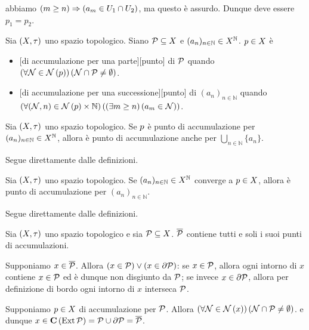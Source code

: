 abbiamo $\left ( m \geq n \right ) \Rightarrow \left ( a_m \in U_1 \cap U_2 \right )$, ma questo \`e
assurdo. Dunque deve essere $p_1 = p_2$. \EndProof
\begin{Definition}
	Sia $(X,\tau)$ uno spazio topologico.
	Siano $\mathcal{P} \subseteq X$ e $(a_n)_{n \in \mathbb{N}} \in X^\mathbb{N}$.
	$p \in X$ \`e
	\begin{itemize}
		\item {}[di accumulazione per una parte][punto] di $\mathcal{P}$ quando $\ForAll{\Neighborhood \in \Neighborhoods{p}}{\Neighborhood \cap \Part \neq \emptyset}$.
		\item {}[di accumulazione per una successione][punto] di $(a_n)_{n \in \mathbb{N}}$ quando $\ForAll{(\Neighborhood,n) \in \Neighborhoods{p} \times\mathbb{N}}{\Exists{m \geq n}{a_m \in \Neighborhood}}$.
	\end{itemize}
\end{Definition}
\begin{Theorem}
	Sia $(X,\tau)$ uno spazio topologico.
	Se $p$ \`e punto di accumulazione per $(a_n)_{n \in \mathbb{N}} \in X^\mathbb{N}$, allora \`e punto di accumulazione anche per $\bigcup_{n \in \mathbb{N}} \lbrace a_n \rbrace$.
\end{Theorem}
\Proof Segue direttamente dalle definizioni. \EndProof
\begin{Theorem}
	Sia $(X,\tau)$ uno spazio topologico.
	Se $(a_n)_{n \in \mathbb{N}} \in X^\mathbb{N}$ converge a $p \in X$, allora \`e punto di accumulazione per $(a_n)_{n \in \mathbb{N}}$.
\end{Theorem}
\Proof Segue direttamente dalle definizioni. \EndProof
\begin{Theorem}
	Sia $(X,\tau)$ uno spazio topologico e sia $\mathcal{P} \subseteq X$. $\overline{\mathcal{P}}$ contiene tutti e soli i suoi punti di accumulazioni.
\end{Theorem}
\par Supponiamo $x \in \overline{\mathcal{P}}$. Allora $\left ( x \in \mathcal{P} \right ) \vee \left ( x \in \partial{\mathcal{P}} \right )$: se $x \in \mathcal{P}$, allora ogni intorno di $x$ contiene $x \in \mathcal{P}$ ed \`e dunque non disgiunto da $\mathcal{P}$; se invece $x \in \partial{\mathcal{P}}$, allora per definizione di bordo ogni intorno di $x$ interseca $\mathcal{P}$.
\par Supponiamo $p \in X$ di accumulazione per $\mathcal{P}$. Allora $\ForAll{\Neighborhood \in \Neighborhoods{x}}{\Neighborhood \cap \Part \neq \emptyset}$. e dunque $x \in \mathbf{C} \left ( \operatorname{Ext}{\mathcal{P}} \right ) = \mathcal{P} \cup \partial{\mathcal{P}} = \overline{\mathcal{P}}$.  \EndProof
